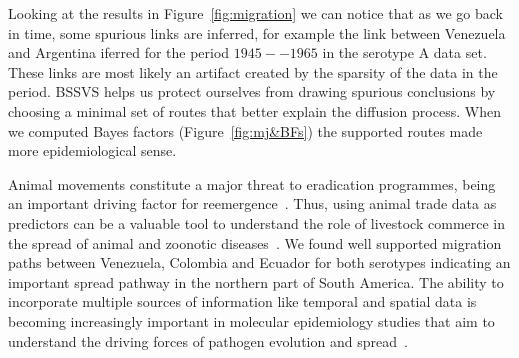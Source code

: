 \documentclass[10pt]{article}
\begin{document}
Looking at the results in Figure~\ref{fig:migration} we can notice that as we go back in time, some spurious links are inferred, for example the link between Venezuela and Argentina iferred for the period $1945--1965$ in the serotype A data set.
These links are most likely an artifact created by the sparsity of the data in the period.
BSSVS helps us protect ourselves from drawing spurious conclusions by choosing a minimal set of routes that better explain the diffusion process. 
When we computed Bayes factors (Figure~\ref{fig:mj&BFs}) the supported routes made more epidemiological sense.

Animal movements constitute a major threat to eradication programmes, being an important driving factor for reemergence~\cite{movements}.
Thus, using animal trade data as predictors can be a valuable tool to understand the role of livestock commerce in the spread of animal and zoonotic diseases~\cite{Nelson2011}.
We found well supported migration paths between Venezuela, Colombia and Ecuador for both serotypes  indicating an important spread pathway in the northern part of South America.
The ability to incorporate multiple sources of information like temporal and spatial data is becoming increasingly important in molecular epidemiology studies that aim to understand the driving forces of pathogen evolution and spread~\cite{towards, combining, MEP, roots}. 

\end{document}
